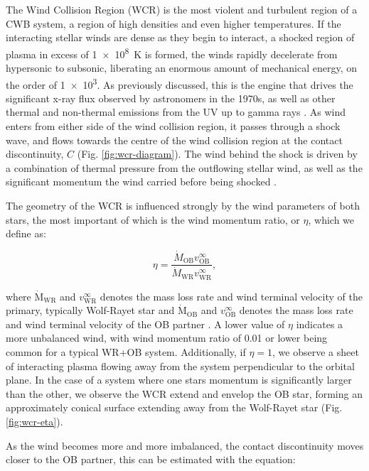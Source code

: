 The Wind Collision Region (WCR) is the most violent and turbulent region of a CWB system, a region of high densities and even higher temperatures.
If the interacting stellar winds are dense as they begin to interact, a shocked region of plasma in excess of \SI{1e8}{\kelvin} is formed, the winds rapidly decelerate from hypersonic to subsonic, liberating an enormous amount of mechanical energy, on the order of \SI{1e3}{\solarluminosity}.
As previously discussed, this is the engine that drives the significant x-ray flux observed by astronomers in the 1970s, as well as other thermal and non-thermal emissions from the UV up to gamma rays \parencite{eichler_particle_1993,grimaldoProtonAccelerationColliding2019}.
As wind enters from either side of the wind collision region, it passes through a shock wave, and flows towards the centre of the wind collision region at the contact discontinuity, $C$ (Fig. \ref{fig:wcr-diagram}).
The wind behind the shock is driven by a combination of thermal pressure from the outflowing stellar wind, as well as the significant momentum the wind carried before being shocked \parencite{stevens_colliding_1992}.

The geometry of the WCR is influenced strongly by the wind parameters of both stars, the most important of which is the wind momentum ratio, or $\eta$, which we define as:

\begin{equation}
  \eta = \frac{\dot M_\text{OB} v^\infty_\text{OB}}{\dot M_\text{WR} v^\infty_\text{WR}},
\end{equation}

\noindent
where $\dot{\text{M}}_\text{WR}$ and $v^{\infty}_\text{WR}$ denotes the mass loss rate and wind terminal velocity of the primary, typically Wolf-Rayet star and $\dot{\text{M}}_\text{OB}$ and $v^{\infty}_\text{OB}$ denotes the mass loss rate and wind terminal velocity of the OB partner \parencite{usov_stellar_1991}.
A lower value of $\eta$ indicates a more unbalanced wind, with wind momentum ratio of \num{0.01} or lower being common for a typical WR+OB system.
Additionally, if $\eta = 1$, we observe a sheet of interacting plasma flowing away from the system perpendicular to the orbital plane.
In the case of a system where one stars momentum is significantly larger than the other, we observe the WCR extend and envelop the OB star, forming an approximately conical surface extending away from the Wolf-Rayet star (Fig. \ref{fig:wcr-eta}).


As the wind becomes more and more imbalanced, the contact discontinuity moves closer to the OB partner, this can be estimated with the equation:

